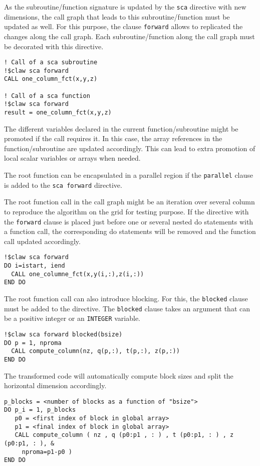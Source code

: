 As the subroutine/function signature is updated by the \lstinline!sca!
directive with new dimensions, the call graph that leads to this
subroutine/function must be updated as well. For this purpose, the clause
\lstinline!forward! allows to replicated the changes along the call graph.
Each subroutine/function along the call graph must be decorated with this
directive.

\begin{lstlisting}
! Call of a sca subroutine
!$claw sca forward
CALL one_column_fct(x,y,z)

! Call of a sca function
!$claw sca forward
result = one_column_fct(x,y,z)
\end{lstlisting}

The different variables declared in the current function/subroutine might be
promoted if the call requires it. In this case, the array references in
the function/subroutine are updated accordingly. This can lead to extra
promotion of local scalar variables or arrays when needed.

The root function can be encapsulated in a parallel region if the
\lstinline|parallel| clause is added to the \lstinline|sca forward| directive.

The root function call in the call graph might be an iteration over several
column to reproduce the algorithm on the grid for testing purpose. If the
directive with the \lstinline!forward! clause is placed just before one or
several nested do statements with a function call, the corresponding do
statements will be removed and the function call updated accordingly.

\begin{lstlisting}
!$claw sca forward
DO i=istart, iend
  CALL one_columne_fct(x,y(i,:),z(i,:))
END DO
\end{lstlisting}

The root function call can also introduce blocking. For this,
the \lstinline|blocked| clause must be added to the directive.
The \lstinline|blocked| clause takes an argument that can be a positive integer
or an \lstinline|INTEGER| variable.


\begin{lstlisting}
!$claw sca forward blocked(bsize)
DO p = 1, nproma
  CALL compute_column(nz, q(p,:), t(p,:), z(p,:))
END DO
\end{lstlisting}

The transformed code will automatically compute block sizes and split the
horizontal dimension accordingly.
\begin{lstlisting}
p_blocks = <number of blocks as a function of "bsize">
DO p_i = 1, p_blocks
   p0 = <first index of block in global array>
   p1 = <final index of block in global array>
   CALL compute_column ( nz , q (p0:p1 , : ) , t (p0:p1, : ) , z (p0:p1, : ), &
     nproma=p1-p0 )
END DO
\end{lstlisting}

